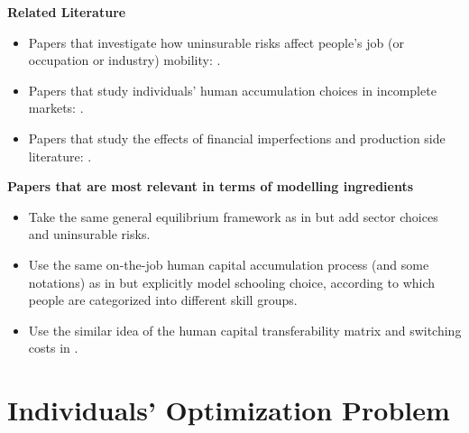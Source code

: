 \documentclass[12pt]{article}
\newcommand{\highlightR}[1]{{\color{MyRed}{#1}}}
\theoremstyle{definition}
\begin{document}
\begin{spacing}{1}
{\noindent \bf Related Literature}

\begin{itemize}[leftmargin=15pt, itemsep=0pt, topsep=0pt]
	\item Papers that investigate how uninsurable risks affect people's job (or occupation or industry) mobility: \citet{cubas2020, kambourov2009, dillon2018, neumuller2015, hawkins2016, cubas2023, cubas2017, low2010, liu2019, altonji2013, dvorkin2019, lee2006}.
	\item Papers that study individuals' human accumulation choices in incomplete markets: \citet{singh2010, krebs2003, park2018, huggett2011, stantcheva2017, huggett2006}.
	\item Papers that study the effects of financial imperfections and production side literature: \citet{buera2011, angeletos2006, krusell2000, midrigan2014, song2011}.
\end{itemize}

{\noindent \bf Papers that are most relevant in terms of modelling ingredients}

\begin{itemize} [leftmargin=15pt, itemsep=0pt, topsep=0pt]
	\item Take the same general equilibrium framework as in \citet{heckman1998} but add sector choices and uninsurable risks.
	\item Use the same on-the-job human capital accumulation process (and some notations) as in \citet{huggett2011} but explicitly model schooling choice, according to which people are categorized into different skill groups.
	\item Use the similar idea of the human capital transferability matrix and switching costs in \citet{dvorkin2019}.%
\end{itemize}


\section{Individuals' Optimization Problem} \label{sec:hh}


\end{spacing}
\end{document}

